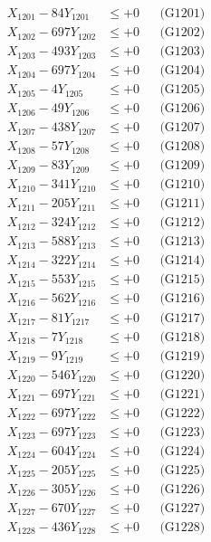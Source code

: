 \documentclass[a4paper,10pt]{article}
\begin{document}
{\begin{align}
\allowbreak
X_{1201} - 84Y_{1201} &\leq +0 && \text{(G1201)} \\
X_{1202} - 697Y_{1202} &\leq +0 && \text{(G1202)} \\
X_{1203} - 493Y_{1203} &\leq +0 && \text{(G1203)} \\
X_{1204} - 697Y_{1204} &\leq +0 && \text{(G1204)} \\
X_{1205} - 4Y_{1205} &\leq +0 && \text{(G1205)} \\
X_{1206} - 49Y_{1206} &\leq +0 && \text{(G1206)} \\
X_{1207} - 438Y_{1207} &\leq +0 && \text{(G1207)} \\
X_{1208} - 57Y_{1208} &\leq +0 && \text{(G1208)} \\
X_{1209} - 83Y_{1209} &\leq +0 && \text{(G1209)} \\
X_{1210} - 341Y_{1210} &\leq +0 && \text{(G1210)} \\
\allowbreak
X_{1211} - 205Y_{1211} &\leq +0 && \text{(G1211)} \\
X_{1212} - 324Y_{1212} &\leq +0 && \text{(G1212)} \\
X_{1213} - 588Y_{1213} &\leq +0 && \text{(G1213)} \\
X_{1214} - 322Y_{1214} &\leq +0 && \text{(G1214)} \\
X_{1215} - 553Y_{1215} &\leq +0 && \text{(G1215)} \\
X_{1216} - 562Y_{1216} &\leq +0 && \text{(G1216)} \\
X_{1217} - 81Y_{1217} &\leq +0 && \text{(G1217)} \\
X_{1218} - 7Y_{1218} &\leq +0 && \text{(G1218)} \\
X_{1219} - 9Y_{1219} &\leq +0 && \text{(G1219)} \\
X_{1220} - 546Y_{1220} &\leq +0 && \text{(G1220)} \\
\allowbreak
X_{1221} - 697Y_{1221} &\leq +0 && \text{(G1221)} \\
X_{1222} - 697Y_{1222} &\leq +0 && \text{(G1222)} \\
X_{1223} - 697Y_{1223} &\leq +0 && \text{(G1223)} \\
X_{1224} - 604Y_{1224} &\leq +0 && \text{(G1224)} \\
X_{1225} - 205Y_{1225} &\leq +0 && \text{(G1225)} \\
X_{1226} - 305Y_{1226} &\leq +0 && \text{(G1226)} \\
X_{1227} - 670Y_{1227} &\leq +0 && \text{(G1227)} \\
X_{1228} - 436Y_{1228} &\leq +0 && \text{(G1228)} \\

\end{align}}
\end{document}

